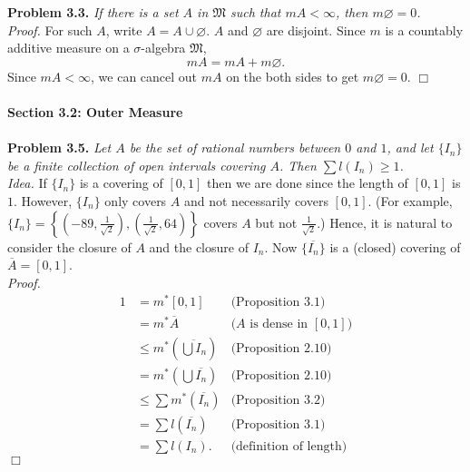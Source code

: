 \documentclass{article}
\begin{document}
\textbf{Problem 3.3.}
\emph{If there is a set $A$ in $\mathfrak{M}$ such that $mA < \infty$,
then $m\varnothing = 0$.} \\

\emph{Proof.}
For such $A$, write $A = A \cup \varnothing$.
$A$ and $\varnothing$ are disjoint.
Since $m$ is a countably additive measure
on a $\sigma$-algebra $\mathfrak{M}$,
$$mA = mA + m\varnothing.$$
Since $mA < \infty$,
we can cancel out $mA$ on the both sides to get
$m\varnothing = 0$.
$\Box$ \\\\



\textbf{\large Section 3.2: Outer Measure} \\\\



\textbf{Problem 3.5.}
\emph{Let $A$ be the set of rational numbers between $0$ and $1$, and
let $\{ I_n\}$ be a finite collection of open intervals covering $A$.
Then $\sum l(I_n) \geq 1$.} \\

\emph{Idea.}
If $\{ I_n\}$ is a covering of $[0, 1]$ then we are done
since the length of $[0, 1]$ is $1$.
However, $\{ I_n\}$ only covers $A$ and not necessarily covers $[0, 1]$.
(For example,
$\{ I_n\}
= \left\{
\left( -89, \frac{1}{\sqrt{2}} \right),
\left( \frac{1}{\sqrt{2}}, 64 \right)
\right\}$ covers $A$ but not $\frac{1}{\sqrt{2}}$.)
Hence, it is natural to consider the closure of $A$ and
the closure of $I_n$.
Now $\{ \overline{I_n} \}$ is a (closed) covering of
$\overline{A} = [0, 1]$. \\

\emph{Proof.}
\begin{align*}
1
&= m^{*}[0, 1]
  &\text{(Proposition 3.1)} \\
&= m^{*}\overline{A}
  &\text{($A$ is dense in $[0, 1]$)} \\
&\leq m^{*}\left( \overline{\bigcup I_n} \right)
  &\text{(Proposition 2.10)} \\
&= m^{*}\left( \bigcup \overline{I_n} \right)
  &\text{(Proposition 2.10)} \\
&\leq \sum m^{*}(\overline{I_n})
  &\text{(Proposition 3.2)} \\
&= \sum l(\overline{I_n})
  &\text{(Proposition 3.1)} \\
&= \sum l(I_n).
  &\text{(definition of length)}
\end{align*}
$\Box$ \\
\end{document}
